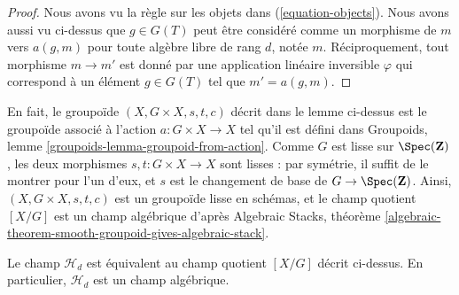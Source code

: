\begin{proof}
Nous avons vu la règle sur les objets dans (\ref{equation-objects}).
Nous avons aussi vu ci-dessus que $g \in G(T)$ peut être considéré comme
un morphisme de $m$ vers $a(g, m)$ pour toute algèbre libre de rang $d$, notée $m$.
Réciproquement, tout morphisme $m \to m'$ est donné par une application linéaire
inversible $\varphi$ qui correspond à un élément $g \in G(T)$ tel
que $m' = a(g, m)$.
\end{proof}

\noindent
En fait, le groupoïde $(X, G \times X, s, t, c)$ décrit dans le
lemme ci-dessus est le groupoïde associé à l'action $a : G \times X \to X$
tel qu'il est défini dans
Groupoids, lemme \ref{groupoids-lemma-groupoid-from-action}.
Comme $G$ est lisse sur $\Spec(\mathbf{Z})$,
les deux morphismes $s, t : G \times X \to X$ sont
lisses : par symétrie, il suffit de le montrer pour l'un d'eux, et
$s$ est le changement de base de $G \to \Spec(\mathbf{Z})$.
Ainsi, $(X, G \times X, s, t, c)$ est un groupoïde lisse en schémas,
et le champ quotient $[X/G]$ est un champ algébrique d'après
Algebraic Stacks,
théorème \ref{algebraic-theorem-smooth-groupoid-gives-algebraic-stack}.

\begin{proposition}
\label{proposition-finite-hilbert-point}
Le champ $\mathcal{H}_d$ est équivalent au champ quotient
$[X/G]$ décrit ci-dessus. En particulier, $\mathcal{H}_d$ est un
champ algébrique.
\end{proposition}


